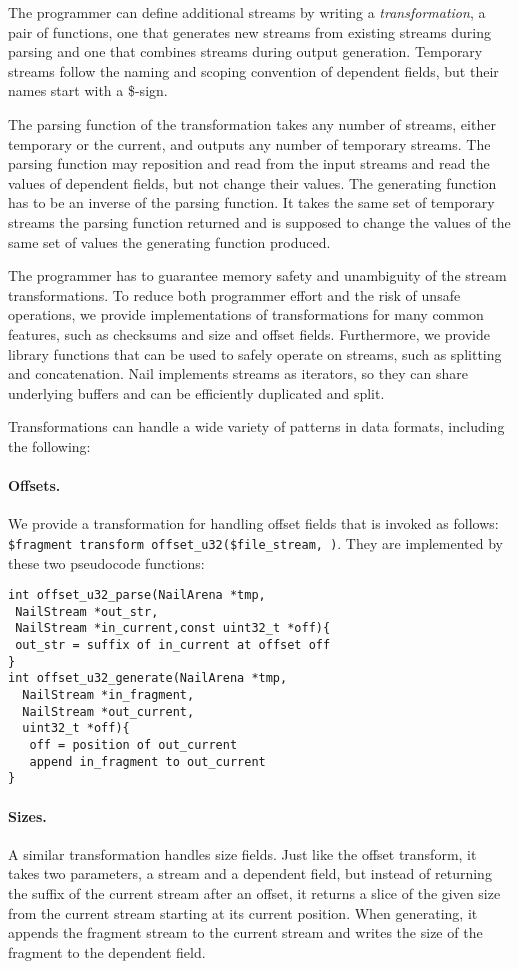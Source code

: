 The programmer can define additional streams by writing a \emph{transformation}, a pair of
functions, one that generates new streams from existing streams during parsing and one that
combines streams during output generation. Temporary streams follow the naming and
scoping convention of dependent fields, but their names start with a \$-sign. 


The parsing function of the transformation takes any number of streams, either temporary or the current,
and outputs any number of temporary streams. The parsing function may reposition and read from the
input streams and read the values of dependent fields, but not change their values. The generating
function has to be an inverse of the parsing function. It takes the same set of temporary streams
the parsing function returned and is supposed to change the values of the same set of values the
generating function produced.

The programmer has to guarantee memory safety and unambiguity of the stream transformations. To
reduce both programmer effort and the risk of unsafe operations, we provide implementations of
transformations for many common features, such as checksums and size and offset fields. Furthermore,
we provide library functions that can be used to safely operate on streams, such as splitting and
concatenation. Nail implements streams as iterators, so they can share underlying buffers and can be
efficiently duplicated and split.

Transformations can handle a wide variety of patterns in data formats, including the following: 
\paragraph{Offsets.}
We provide a transformation for handling offset fields that is invoked as follows:
\texttt{\$fragment transform offset\_u32(\$file\_stream, \@offset)}. 
They are implemented by these two pseudocode functions:
\begin{verbatim}
int offset_u32_parse(NailArena *tmp,
 NailStream *out_str,
 NailStream *in_current,const uint32_t *off){
 out_str = suffix of in_current at offset off
}
int offset_u32_generate(NailArena *tmp,
  NailStream *in_fragment,
  NailStream *out_current,
  uint32_t *off){
   off = position of out_current
   append in_fragment to out_current
}
\end{verbatim}


\paragraph{Sizes.}
A similar transformation handles size fields. Just like the offset transform, it takes two parameters, a
stream and a dependent field, but instead of returning the suffix of the current stream after an
offset, it returns a slice of the given size from the current stream starting at its current
position. When generating, it appends the fragment stream to the current stream and writes the size
of the fragment to the dependent field.

